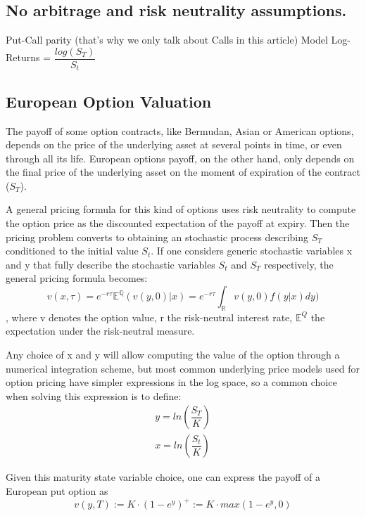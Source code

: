 \documentclass[12,twoside]{mammeTFM}
\theoremstyle{definition}
\theoremstyle{remark}
\newcommand{\E}{\ensuremath{\mathbb{E}}}
\newcommand{\Q}{\ensuremath{\mathbb{Q}}}
\newcommand{\R}{\ensuremath{\mathbb{R}}}
\begin{document}
\subsection{No arbitrage and risk neutrality assumptions.}

Put-Call parity (that's why we only talk about Calls in this article)
Model
Log-Returns = $\dfrac{log(S_T)}{S_t}$

\subsection{European Option Valuation} \label{subsec:european_option_valuation}
The payoff of some option contracts, like Bermudan, Asian or American options, depends on the price of the underlying asset at several points in time, or even through all its life. European options payoff, on the other hand, only depends on the final price of the underlying asset on the moment of expiration of the contract ($S_T$). 

A general pricing formula for this kind of options uses risk neutrality to compute the option price as the discounted expectation of the payoff at expiry. Then the pricing problem converts to obtaining an stochastic process describing $S_T$ conditioned to the initial value $S_t$. If one considers generic stochastic variables x and y that fully describe the stochastic variables $S_t$ and $S_T$ respectively, the general pricing formula becomes:
\begin{equation}
\label{eq:integral_option_valuation}
v(x, \tau)  = e^{-r \tau}\E^{\Q}(v(y, 0)|x)  = e^{-r\tau} \int_{\R}v(y,0)f(y|x)dy)
\end{equation}
, where v denotes the option value, r the risk-neutral interest rate, $\E^Q$ the expectation under the risk-neutral measure.

Any choice of x and y will allow computing the value of the option through a numerical integration scheme, but most common underlying price models used for option pricing have simpler expressions in the log space, so a common choice when solving this expression is to define:
\begin{align}
\label{eq:y}
y = ln \left(\dfrac{S_T}{K} \right) \\
\label{eq:x}
x = ln \left(\dfrac{S_t}{K} \right)
\end{align}

Given this maturity state variable choice, one can express the payoff of a European put option as
\begin{equation} \label{eq:european_payoff}
v(y, T) := K \cdot (1 - e^y)^{+} := K \cdot max(1 - e^y, 0)
\end{equation}
\end{document}
